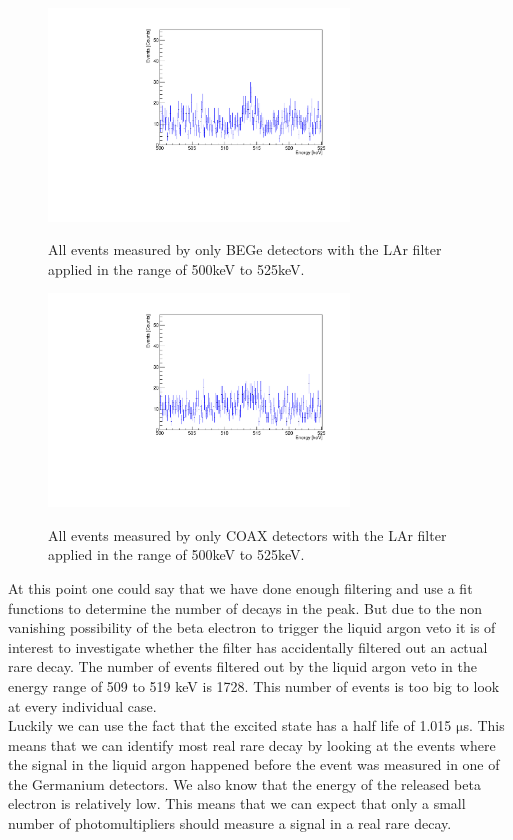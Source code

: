 \begin{figure}[t!]
\centering
\begin{minipage}{.5\textwidth}
  \centering
	\includegraphics[width=80mm]{./Bilder/500525LArVetoBEGes.pdf}
  \caption{}{All events measured by only BEGe detectors with the LAr filter applied in the range of 500keV to 525keV.}
  \label{fig:LArBEGes}
\end{minipage}%
\begin{minipage}{.5\textwidth}
  \centering
	\includegraphics[width=80mm]{./Bilder/500525LArVetoCOAX.pdf}
  \caption{}{All events measured by only COAX detectors with the LAr filter applied in the range of 500keV to 525keV.}
  \label{fig:LArCOAX}
\end{minipage}
\end{figure}

At this point one could say that we have done enough filtering and use a fit functions to determine the number of decays in the peak.
But due to the non vanishing possibility of the beta electron to trigger the liquid argon veto it is of interest to investigate whether the filter has accidentally filtered out an actual rare  decay.
The number of events filtered out by the liquid argon veto in the energy range of 509 to 519 keV is 1728.
This number of events is too big to look at every individual case.
\\

Luckily we can use the fact that the excited  state has a half life of 1.015 \(\mathrm{\mu}\)s.
This means that we can identify most real rare  decay by looking at the events where the signal in the liquid argon happened before the event was measured in one of the Germanium detectors.
We also know that the energy of the released beta electron is relatively low.
This means that we can expect that only a small number of photomultipliers should measure a signal in a real rare  decay.
\\

